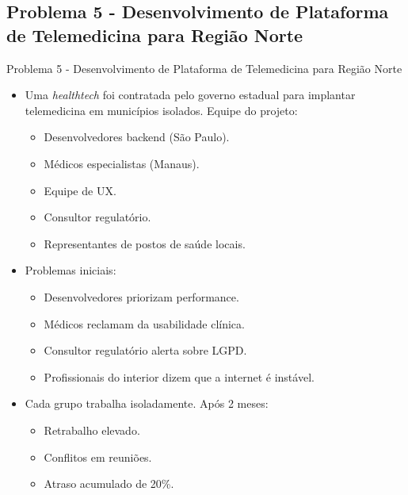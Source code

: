 \documentclass{beamer}
\begin{document}
\subsection{Problema 5 - Desenvolvimento de Plataforma de Telemedicina para Região Norte}

\begin{frame}{Problema 5 - Desenvolvimento de Plataforma de Telemedicina para Região Norte}
	\begin{itemize}
		\justifying
		\item Uma \textit{healthtech} foi contratada pelo governo estadual para implantar telemedicina em municípios isolados. Equipe do projeto:
			\begin{itemize}
				\item Desenvolvedores backend (São Paulo).
				\item Médicos especialistas (Manaus).
				\item Equipe de UX.
				\item Consultor regulatório.
				\item Representantes de postos de saúde locais.
			\end{itemize}
		\item Problemas iniciais:
			\begin{itemize}
				\item Desenvolvedores priorizam performance.
				\item Médicos reclamam da usabilidade clínica.
				\item Consultor regulatório alerta sobre LGPD.
				\item Profissionais do interior dizem que a internet é instável.
			\end{itemize}
		\item Cada grupo trabalha isoladamente. Após 2 meses:
			\begin{itemize}
				\item Retrabalho elevado.
				\item Conflitos em reuniões.
				\item Atraso acumulado de 20\%.
			\end{itemize}
	\end{itemize}
\end{frame}
\end{document}

